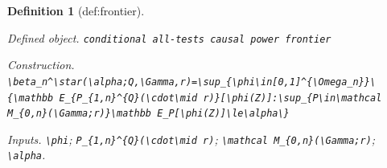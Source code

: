 \documentclass{article}
\newtheorem{definition}{Definition}
\begin{document}
\begin{definition}[def:frontier]\label{def:frontier}
\par\smallskip\noindent\emph{Defined object.} \texttt{conditional all-\allowbreak{}tests causal power frontier}
\par\smallskip\noindent\emph{Construction.} \texttt{\textbackslash{}\allowbreak{}beta\_\allowbreak{}n\textasciicircum{}\textbackslash{}\allowbreak{}star(\textbackslash{}\allowbreak{}alpha;\allowbreak{}Q,\allowbreak{}\textbackslash{}\allowbreak{}Gamma,\allowbreak{}r)=\allowbreak{}\textbackslash{}\allowbreak{}sup\_\allowbreak{}\{\textbackslash{}\allowbreak{}phi\textbackslash{}\allowbreak{}in[0,\allowbreak{}1]\textasciicircum{}\{\textbackslash{}\allowbreak{}Omega\_\allowbreak{}n\}\allowbreak{}\}\allowbreak{}\textbackslash{}\allowbreak{}\{\textbackslash{}\allowbreak{}mathbb E\_\allowbreak{}\{P\_\allowbreak{}\{1,\allowbreak{}n\}\allowbreak{}\textasciicircum{}\{Q\}\allowbreak{}(\textbackslash{}\allowbreak{}cdot\textbackslash{}\allowbreak{}mid r)\}\allowbreak{}[\textbackslash{}\allowbreak{}phi(Z)]:\allowbreak{}\textbackslash{}\allowbreak{}sup\_\allowbreak{}\{P\textbackslash{}\allowbreak{}in\textbackslash{}\allowbreak{}mathcal M\_\allowbreak{}\{0,\allowbreak{}n\}\allowbreak{}(\textbackslash{}\allowbreak{}Gamma;\allowbreak{}r)\}\allowbreak{}\textbackslash{}\allowbreak{}mathbb E\_\allowbreak{}P[\textbackslash{}\allowbreak{}phi(Z)]\textbackslash{}\allowbreak{}le\textbackslash{}\allowbreak{}alpha\textbackslash{}\allowbreak{}\}\allowbreak{}}
\par\smallskip\noindent\emph{Inputs.} \texttt{\textbackslash{}\allowbreak{}phi}; \texttt{P\_\allowbreak{}\{1,\allowbreak{}n\}\allowbreak{}\textasciicircum{}\{Q\}\allowbreak{}(\textbackslash{}\allowbreak{}cdot\textbackslash{}\allowbreak{}mid r)}; \texttt{\textbackslash{}\allowbreak{}mathcal M\_\allowbreak{}\{0,\allowbreak{}n\}\allowbreak{}(\textbackslash{}\allowbreak{}Gamma;\allowbreak{}r)}; \texttt{\textbackslash{}\allowbreak{}alpha}.
\end{definition}
\end{document}

